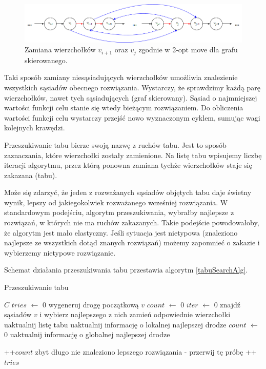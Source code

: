 \documentclass[11pt,a4paper,twoside]{article}
\begin{document}
\begin{figure}[ht]
\vspace{-20pt}
\centering
\includegraphics[width=15cm]{2optMove}
\caption{Zamiana wierzchołków $v_{i+1}$ oraz $v_{j}$ zgodnie w 2-opt move dla grafu skierowanego.}
\label{2optMove}
\end{figure}

Taki sposób zamiany niesąsiadujących wierzchołków umożliwia znalezienie wszystkich sąsiadów obecnego rozwiązania. Wystarczy, że sprawdzimy każdą parę wierzchołków, nawet tych sąsiadujących (graf skierowany). Sąsiad o najmniejszej wartości funkcji celu stanie się wtedy bieżącym rozwiązaniem. Do obliczenia wartości funkcji celu wystarczy przejść nowo wyznaczonym cyklem, sumując wagi kolejnych krawędzi.

Przeszukiwanie tabu bierze swoją nazwę z ruchów tabu. Jest to sposób zaznaczania, które wierzchołki zostały zamienione. Na listę tabu wpisujemy liczbę iteracji algorytmu, przez którą ponowna zamiana tychże wierzchołków staje się zakazana (tabu). 

Może się zdarzyć, że jeden z rozważanych sąsiadów objętych tabu daje świetny wynik, lepszy od jakiegokolwiek rozważanego wcześniej rozwiązania. W standardowym podejściu, algorytm przeszukiwania, wybrałby najlepsze z rozwiązań, w których nie ma ruchów zakazanych. Takie podejście powodowałoby, że algorytm jest mało elastyczny. Jeśli sytuacja jest nietypowa (znaleziono najlepsze ze wszystkich dotąd znanych rozwiązań) możemy zapomnieć o zakazie i wybierzemy nietypowe rozwiązanie. 

Schemat działania przeszukiwania tabu przestawia algorytm \ref{tabuSearchAlg}.

\begin{algorithm}[ht]
\caption{Przeszukiwanie tabu}
\label{tabuSearchAlg}
\begin{algorithmic}%
\Require $C$
	\State $tries$ $\leftarrow$ 0
		\State wygeneruj drogę początkową $v$
		\State $count$ $\leftarrow$ 0
		\State $iter$ $\leftarrow$ 0
			\State znajdź sąsiadów $v$ i wybierz najlepszego z nich
			\State zamień odpowiednie wierzchołki
			\State uaktualnij listę tabu
				\State uaktualnij informację o lokalnej najlepszej drodze
				\State $count$ $\leftarrow$ 0
					\State uaktualnij informację o globalnej najlepszej drodze
					
    			\EndIf
    		
    		\Else
    			\State ++$count$
    		\EndIf
    			\State zbyt długo nie znaleziono lepszego rozwiązania - przerwij tę próbę
    		\EndIf
		\EndWhile
		\State ++$tries$
	\EndWhile
\end{algorithmic}
\end{algorithm}
\end{document}
